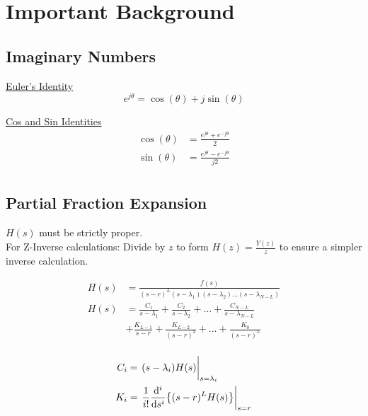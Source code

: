 \documentclass[]{article}
\begin{document}
\pagestyle{headings}

\section*{Important Background}

\subsection*{Imaginary Numbers}
\begin{multicols}{2}
\underline{Euler's Identity}
\begin{displaymath}
	e^{j\theta} = \cos(\theta) + j \sin(\theta)
\end{displaymath}
\columnbreak

\underline{Cos and Sin Identities}
\begin{align*}
	\cos(\theta) &= \frac{e^{j\theta}+e^{-j\theta}}{2}\\
	\sin(\theta) &= \frac{e^{j\theta}-e^{-j\theta}}{j 2}\\
\end{align*}
\end{multicols}


\subsection*{Partial Fraction Expansion}
$H(s)$ must be strictly proper.\\
For Z-Inverse calculations: Divide by $z$ to form $H(z) = \frac{Y(z)}{z}$ to ensure a simpler inverse calculation.
\begin{multicols}{2}

\begin{align*}
	H(s)	&= \frac{f(s)}{(s-r)^L(s-\lambda_1)(s-\lambda_2) ... (s-\lambda_{N-L})}\\
	H(s)	&= \frac{C_1}{s-\lambda_1} + \frac{C_2}{s-\lambda_2} + ... + \frac{C_{N-L}}{s-\lambda_{N-L}}\\
			&+ \frac{K_{L-1}}{s-r} + \frac{K_{L-2}}{(s-r)^2} + ... + \frac{K_0}{(s-r)^L}\\
\end{align*}
		
\begin{align*}
	C_i		&= \eval{(s-\lambda_i) H(s)}_{s=\lambda_i}\\
	K_i		&= \eval{\frac{1}{i!} \dv[i]{s} \qty{(s-r)^L H(s)}}_{s=r}
\end{align*}
\end{multicols}
\end{document}
